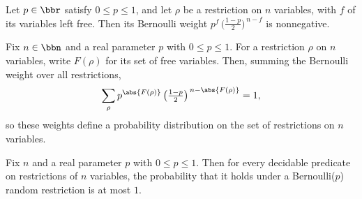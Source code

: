 \begin{lemma}
\label{SwitchingLemma.bernoulliRestrWeight_nonneg'}
\leanok
{}
Let $p \in \bbr$ satisfy $0 \le p \le 1$, and let $\rho$ be a restriction on $n$
variables, with $f$ of its variables left free. Then its Bernoulli weight
$p^{f}\,\bigl(\tfrac{1-p}{2}\bigr)^{\,n - f}$ is nonnegative.
\end{lemma}

\begin{lemma}
\label{SwitchingLemma.bernoulliRestrWeight_sum_one}
\leanok
{}
Fix $n \in \bbn$ and a real parameter $p$ with $0 \le p \le 1$. For a restriction $\rho$
on $n$ variables, write $F(\rho)$ for its set of free variables. Then, summing the
Bernoulli weight over all restrictions,
\[
  \sum_{\rho} p^{\abs{F(\rho)}} \left(\tfrac{1-p}{2}\right)^{\,n - \abs{F(\rho)}} = 1,
\]
so these weights define a probability distribution on the set of restrictions on $n$
variables.
\end{lemma}

\begin{lemma}
\label{SwitchingLemma.bernoulliRestrProb_le_one'}
\leanok
{}
Fix $n$ and a real parameter $p$ with $0 \le p \le 1$. Then for every decidable
predicate on restrictions of $n$ variables, the probability that it holds under a
Bernoulli($p$) random restriction is at most $1$.
\end{lemma}
